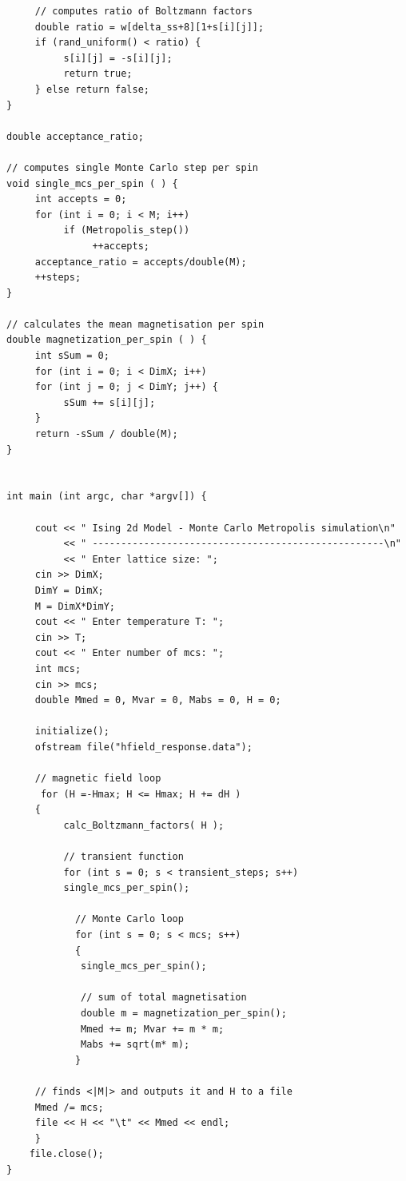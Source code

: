 \documentclass[a4paper]{article}
\begin{document}
\begin{verbatim}
     // computes ratio of Boltzmann factors
     double ratio = w[delta_ss+8][1+s[i][j]];
     if (rand_uniform() < ratio) {
          s[i][j] = -s[i][j];
          return true;
     } else return false;
}

double acceptance_ratio;

// computes single Monte Carlo step per spin
void single_mcs_per_spin ( ) {
     int accepts = 0;
     for (int i = 0; i < M; i++)
          if (Metropolis_step())
               ++accepts;
     acceptance_ratio = accepts/double(M);
     ++steps;
}

// calculates the mean magnetisation per spin
double magnetization_per_spin ( ) {
     int sSum = 0;
     for (int i = 0; i < DimX; i++)
     for (int j = 0; j < DimY; j++) {
          sSum += s[i][j];
     }
     return -sSum / double(M);
}


int main (int argc, char *argv[]) {

     cout << " Ising 2d Model - Monte Carlo Metropolis simulation\n"
          << " ---------------------------------------------------\n"
          << " Enter lattice size: ";
     cin >> DimX;
     DimY = DimX;
     M = DimX*DimY;
     cout << " Enter temperature T: ";
     cin >> T;
     cout << " Enter number of mcs: ";
     int mcs;
     cin >> mcs;
     double Mmed = 0, Mvar = 0, Mabs = 0, H = 0;

     initialize();
     ofstream file("hfield_response.data");

     // magnetic field loop
      for (H =-Hmax; H <= Hmax; H += dH )
     {
          calc_Boltzmann_factors( H );

          // transient function
          for (int s = 0; s < transient_steps; s++)
          single_mcs_per_spin();

            // Monte Carlo loop
            for (int s = 0; s < mcs; s++)
            {
             single_mcs_per_spin();

             // sum of total magnetisation
             double m = magnetization_per_spin();
             Mmed += m; Mvar += m * m;
             Mabs += sqrt(m* m);
            }

     // finds <|M|> and outputs it and H to a file
     Mmed /= mcs;
     file << H << "\t" << Mmed << endl;
     }
    file.close();
}

\end{verbatim}
\end{document}

